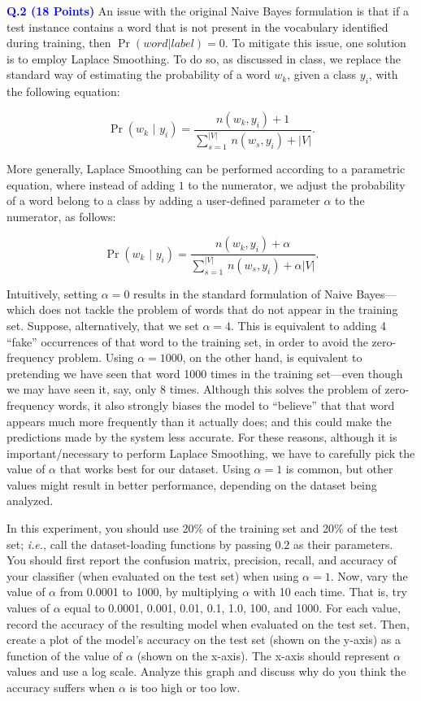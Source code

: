 \documentclass[letterpaper]{article}
\newcommand{\HIGHLIGHT}[1]{\textcolor{blue}{\textbf{#1}}}
\begin{document}
\noindent \HIGHLIGHT{Q.2 (18 Points)} An issue with the original Naive Bayes formulation is that if a test instance contains a word that is not present in the vocabulary identified during training, then  $\Pr(word|label)=0$. To mitigate this issue, one solution is to employ Laplace Smoothing. To do so, as discussed in class, we replace the standard way of estimating the probability of a word $w_k$, given a class $y_i$, with the following equation:

\begin{equation}
    \Pr\left(w_k\,\,|\,\,y_i\right) = \frac{n(w_k, y_i) + 1}{\sum_{s=1}^{|V|} \, n(w_s, y_i) + |V|}.
\end{equation}

More generally, Laplace Smoothing can be performed according to a parametric equation, where instead of adding $1$ to the numerator, we adjust the probability of a word belong to a class by adding a user-defined parameter $\alpha$ to the numerator, as follows:

\begin{equation}
    \Pr\left(w_k\,\,|\,\,y_i\right) = \frac{n(w_k, y_i) + \alpha}{\sum_{s=1}^{|V|} \, n(w_s, y_i) + \alpha |V|}.
\end{equation}

Intuitively, setting $\alpha = 0$ results in the standard formulation of Naive Bayes---which does not tackle the problem of words that do not appear in the training set. Suppose, alternatively, that we set $\alpha=4$. This is equivalent to adding 4 ``fake'' occurrences of that word to the training set, in order to avoid the zero-frequency problem. Using $\alpha=1000$, on the other hand, is equivalent to pretending we have seen that word 1000 times in the training set---even though we may have seen it, say, only 8 times. Although this solves the problem of zero-frequency words, it also strongly biases the model to ``believe'' that that word appears much more frequently than it actually does; and this could make the predictions made by the system less accurate. For these reasons, although it is important/necessary to perform Laplace Smoothing, we have to carefully pick the value of $\alpha$ that works best for our dataset. Using $\alpha=1$ is common, but other values might result in better performance, depending on the dataset being analyzed.

In this experiment, you should use 20\% of the training set and 20\% of the test set; \textit{i.e.}, call the dataset-loading functions by passing $0.2$ as their parameters. You should first report the confusion matrix, precision, recall, and accuracy of your classifier (when evaluated on the test set) when using $\alpha = 1$. Now, vary the value of $\alpha$ from 0.0001 to 1000, by multiplying $\alpha$ with 10 each time. That is, try values of $\alpha$ equal to 0.0001, 0.001, 0.01, 0.1, 1.0, 100, and 1000. For each value, record the accuracy of the resulting model when evaluated on the test set. Then, create a plot of the model's accuracy on the test set (shown on the y-axis) as a function of the value of $\alpha$ (shown on the x-axis). The x-axis should represent $\alpha$ values and use a log scale. Analyze this graph and discuss why do you think the accuracy suffers when $\alpha$ is too high or too low.
%
%
\end{document}

